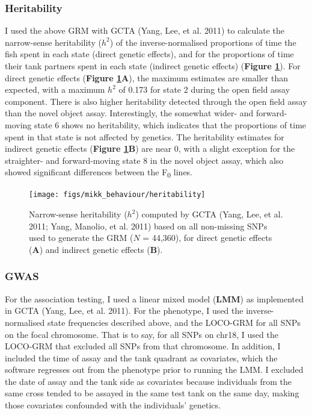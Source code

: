 \documentclass[
]{book}
\begin{document}
\hypertarget{heritability}{%
\subsubsection{Heritability}\label{heritability}}

I used the above GRM with GCTA (Yang, Lee, et al. 2011) to calculate the narrow-sense heritability (\(h^2\)) of the inverse-normalised proportions of time the fish spent in each state (direct genetic effects), and for the proportions of time their tank partners spent in each state (indirect genetic effects) (\textbf{Figure \ref{fig:F2-heritability}}). For direct genetic effects (\textbf{Figure \ref{fig:F2-heritability}A}), the maximum estimates are smaller than expected, with a maximum \(h^2\) of 0.173 for state 2 during the open field assay component. There is also higher heritability detected through the open field assay than the novel object assay. Interestingly, the somewhat wider- and forward-moving state 6 shows no heritability, which indicates that the proportions of time spent in that state is not affected by genetics. The heritability estimates for indirect genetic effects (\textbf{Figure \ref{fig:F2-heritability}B}) are near 0, with a slight exception for the straighter- and forward-moving state 8 in the novel object assay, which also showed significant differences between the F\textsubscript{0} lines.



\begin{figure}
\texttt{[image: figs/mikk\_behaviour/heritability]} \caption{Narrow-sense heritability (\(h^2\)) computed by GCTA (Yang, Lee, et al. 2011; Yang, Manolio, et al. 2011) based on all non-missing SNPs used to generate the GRM (\(N\) = 44,360), for direct genetic effects (\textbf{A}) and indirect genetic effects (\textbf{B}).}\label{fig:F2-heritability}
\end{figure}

\hypertarget{gwas-1}{%
\subsubsection{GWAS}\label{gwas-1}}

For the association testing, I used a linear mixed model (\textbf{LMM}) as implemented in GCTA (Yang, Lee, et al. 2011). For the phenotype, I used the inverse-normalised state frequencies described above, and the LOCO-GRM for all SNPs on the focal chromosome. That is to say, for all SNPs on chr18, I used the LOCO-GRM that excluded all SNPs from that chromosome. In addition, I included the time of assay and the tank quadrant as covariates, which the software regresses out from the phenotype prior to running the LMM. I excluded the date of assay and the tank side as covariates because individuals from the same cross tended to be assayed in the same test tank on the same day, making those covariates confounded with the individuals' genetics.
\end{document}
